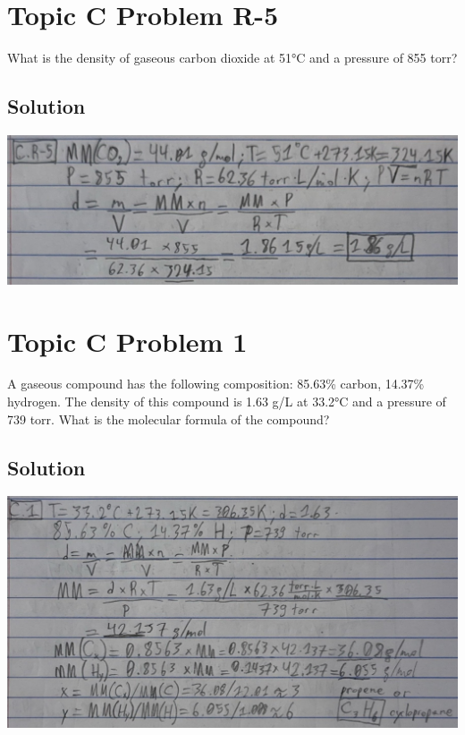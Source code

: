 \documentclass[10pt]{article}
\begin{document}
    \pagebreak
    \section{Topic C Problem R-5}
        What is the density of gaseous carbon dioxide at 51\unit{\celsius} and a pressure of 855 torr?

        \subsection{Solution}
            \begin{center}
                \includegraphics[width=\textwidth]{Answers Images/answer_C_R-5.jpg}
            \end{center}

    \pagebreak
    \section{Topic C Problem 1}
        A gaseous compound has the following composition: 85.63\% carbon, 14.37\% hydrogen. 
        The density of this compound is 1.63 g/L at 33.2\unit{\celsius} and a pressure of 739 torr. 
        What is the molecular formula of the compound?

        \subsection{Solution}
            \begin{center}
                \includegraphics[width=\textwidth]{Answers Images/answer_C_1.jpg}
            \end{center}
\end{document}
